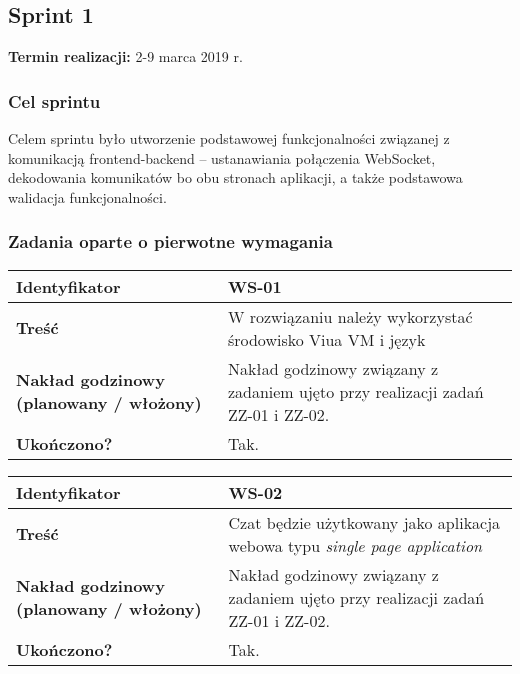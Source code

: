 \subsection{Sprint 1}

\textbf{Termin realizacji:} 2-9 marca 2019 r.

\subsubsection{Cel sprintu}
Celem sprintu było utworzenie podstawowej funkcjonalności związanej z
komunikacją frontend-backend -- ustanawiania połączenia WebSocket,
dekodowania komunikatów bo obu stronach aplikacji, a także podstawowa
walidacja funkcjonalności.

\subsubsection{Zadania oparte o pierwotne wymagania}
\leavevmode\hbox{}

\begin{tabular}{ | l | l | }
	\hline
		\textbf{Identyfikator} &
	WS-01
		\\

	\hline
		\textbf{Treść} & \parbox[t]{11.5cm}{\strut
			W rozwiązaniu należy wykorzystać środowisko Viua VM i
			język \ViuAct
		\strut}\\

	\hline
  \parbox[t]{4cm}{\textbf{Nakład godzinowy (planowany / włożony)}} & \parbox[t]{11.5cm}{\strut
    Nakład godzinowy związany z zadaniem ujęto przy realizacji zadań ZZ-01 i
    ZZ-02.
  \strut}\\

\hline
  \parbox[t]{4cm}{\textbf{Ukończono?}} &
  \parbox[t]{11.5cm}{\strut
    Tak.
  \strut}\\

\hline
\end{tabular}

\vspace{1em}

\begin{tabular}{ | l | l | }
	\hline
		\textbf{Identyfikator} &
	WS-02
		\\

	\hline
		\textbf{Treść} & \parbox[t]{11.5cm}{\strut
			Czat będzie użytkowany jako aplikacja webowa typu
			\textit{single page application}
		\strut}\\

	\hline
  \parbox[t]{4cm}{\textbf{Nakład godzinowy (planowany / włożony)}} & \parbox[t]{11.5cm}{\strut
    Nakład godzinowy związany z zadaniem ujęto przy realizacji zadań ZZ-01 i
    ZZ-02.
  \strut}\\

\hline
  \parbox[t]{4cm}{\textbf{Ukończono?}} &
  \parbox[t]{11.5cm}{\strut
    Tak.
  \strut}\\

\hline
\end{tabular}


